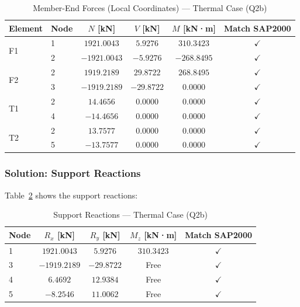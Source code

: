 \documentclass[12pt,a4paper]{article}
\begin{document}
\begin{table}[H]
    \centering
    \caption{Member-End Forces (Local Coordinates) --- Thermal Case (Q2b)}
    \label{tab:thermal_member_forces}
    \begin{tabular}{llcccc}
        \toprule
        \textbf{Element} & \textbf{Node} & \textbf{$N$ [kN]} & \textbf{$V$ [kN]} & \textbf{$M$ [kN·m]} & \textbf{Match SAP2000} \\
        \midrule
        \multirow{2}{*}{F1} & 1 & $1921.0043$  & $5.9276$   & $310.3423$  & $\checkmark$ \\
                            & 2 & $-1921.0043$ & $-5.9276$  & $-268.8495$ & $\checkmark$ \\
        \midrule
        \multirow{2}{*}{F2} & 2 & $1919.2189$  & $29.8722$  & $268.8495$  & $\checkmark$ \\
                            & 3 & $-1919.2189$ & $-29.8722$ & $0.0000$    & $\checkmark$ \\
        \midrule
        \multirow{2}{*}{T1} & 2 & $14.4656$    & $0.0000$   & $0.0000$    & $\checkmark$ \\
                            & 4 & $-14.4656$   & $0.0000$   & $0.0000$    & $\checkmark$ \\
        \midrule
        \multirow{2}{*}{T2} & 2 & $13.7577$    & $0.0000$   & $0.0000$    & $\checkmark$ \\
                            & 5 & $-13.7577$   & $0.0000$   & $0.0000$    & $\checkmark$ \\
        \bottomrule
    \end{tabular}
\end{table}

\subsubsection{Solution: Support Reactions}

Table~\ref{tab:thermal_reactions} shows the support reactions:

\begin{table}[H]
    \centering
    \caption{Support Reactions --- Thermal Case (Q2b)}
    \label{tab:thermal_reactions}
    \begin{tabular}{lcccc}
        \toprule
        \textbf{Node} & \textbf{$R_x$ [kN]} & \textbf{$R_y$ [kN]} & \textbf{$M_z$ [kN·m]} & \textbf{Match SAP2000} \\
        \midrule
        1 & $1921.0043$  & $5.9276$   & $310.3423$ & $\checkmark$ \\
        3 & $-1919.2189$ & $-29.8722$ & Free       & $\checkmark$ \\
        4 & $6.4692$     & $12.9384$  & Free       & $\checkmark$ \\
        5 & $-8.2546$    & $11.0062$  & Free       & $\checkmark$ \\
        \bottomrule
    \end{tabular}
\end{table}
\end{document}
